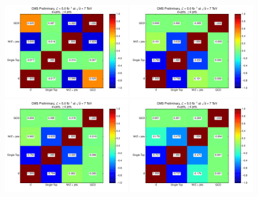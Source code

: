 \begin{figure}[hbtp]
    \centering
     \includegraphics[width=0.48\textwidth]{Chapters/04_Analysis/04b_XSections/images/fitchecks/7TeV/Correlations_electron_MET_0-27.pdf}\hfill
     \includegraphics[width=0.48\textwidth]{Chapters/04_Analysis/04b_XSections/images/fitchecks/7TeV/Correlations_electron_MET_27-52.pdf}\\
	 \includegraphics[width=0.48\textwidth]{Chapters/04_Analysis/04b_XSections/images/fitchecks/7TeV/Correlations_electron_MET_52-87.pdf}\hfill
	 \includegraphics[width=0.48\textwidth]{Chapters/04_Analysis/04b_XSections/images/fitchecks/7TeV/Correlations_electron_MET_87-130.pdf}\\

\end{figure}
